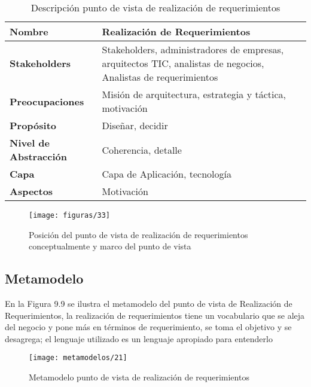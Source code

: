    \begin{table}[H]
   	\centering
   	\begin{tabular}{p{3.7cm}p{8cm}}
   		\hline
   		\rowcolor[HTML]{0073a1}
   		{\color[HTML]{FFFFFF} \textbf{Nombre}} & {\color[HTML]{FFFFFF} \textbf{Realización de Requerimientos}} \\
   		\hline
   		\textbf{Stakeholders} & Stakeholders, administradores de empresas, arquitectos TIC, analistas de negocios, Analistas de requerimientos \\
   		\textbf{Preocupaciones} & Misión de arquitectura, estrategia y táctica, motivación \\
   		\textbf{Propósito} & Diseñar, decidir \\
   		\textbf{Nivel de Abstracción} & Coherencia, detalle \\
   		\textbf{Capa} & Capa de Aplicación, tecnología \\
   		\textbf{Aspectos} & Motivación \\
   		\bottomrule
   	\end{tabular}
   	\captionsetup{width=.95\textwidth}
   	\caption{Descripción punto de vista de realización de requerimientos}
   	\label{tabla24}
   \end{table}
   
   \begin{figure}[H]
   	\centering
   	\texttt{[image: figuras/33]}
   	\captionsetup{width=.95\textwidth}
   	\caption{Posición del punto de vista de realización de requerimientos conceptualmente y marco del punto de vista}
   	\label{figura33}
   \end{figure}
   
   \subsection{Metamodelo}
   En la Figura 9.9 se ilustra el metamodelo del punto de vista de Realización de Requerimientos, la realización de requerimientos tiene un vocabulario que se aleja del negocio y pone más en términos de requerimiento, se toma el objetivo y se desagrega; el lenguaje utilizado es un lenguaje apropiado para entenderlo
   
   \begin{figure}[H]
   	\centering
   	\texttt{[image: metamodelos/21]}
   	\captionsetup{width=.95\textwidth}
   	\caption{Metamodelo punto de vista de realización de requerimientos}
   	\label{metamodelo21}
   \end{figure}
   
